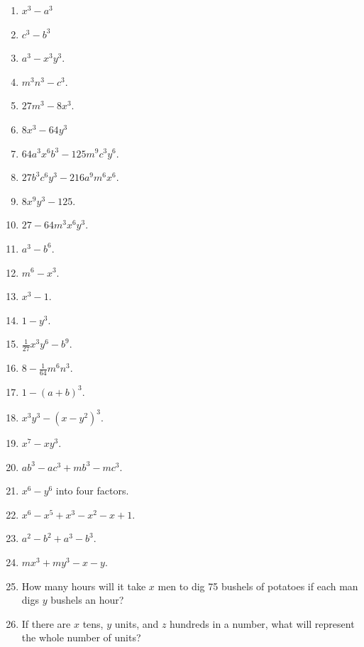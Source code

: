 \documentclass{book}
\begin{document}
\begin{enumerate}
\item $x^3 - a^3$

\item $c^3 - b^3$

\item $a^3 - x^3y^3.$

\item $m^3n^3 - c^3.$

\item $27m^3 - 8x^3.$

\item $8x^3 -64y^3$

\item $64a^3x^6b^3 - 125m^9c^3y^6.$

\item $27b^3c^6y^3 - 216a^9m^6x^6.$

\item $8x^9y^3 - 125.$

\item $27 - 64m^3x^6y^3.$

\item $a^3-b^6.$

\item $m^6 - x^3.$

\item $x^3 - 1.$

\item $1 - y^3.$

\item $\frac{1}{27}x^3y^6 - b^9.$

\item $8 - \frac{1}{64}m^6n^3.$

\item $1 - (a + b)^3.$

\item $x^3y^3 - (x - y^2)^3.$

\item $x^7 - xy^3.$

\item $ab^3 - ac^3 + mb^3 - mc^3.$

\item $x^6 - y^6$ into four factors.

\item $x^6 - x^5 + x^3 - x^2 - x + 1.$

\item $a^2 - b^2 + a^3 -b^3.$

\item $mx^3 + my^3 - x - y.$

\item How many hours will it take $x$ men to dig 75 bushels of
potatoes if each man digs $y$ bushels an hour?

\item If there are $x$ tens, $y$ units, and $z$ hundreds in a
number, what will represent the whole number of units?
\end{enumerate}
\end{document}
